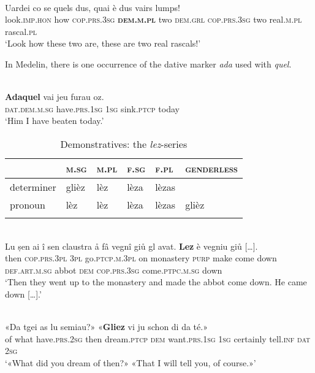 {\ea\label{ex:1:}
\\
\gll Uardei co se quels dus, quai è dus vairs lumps!\\
     look.\textsc{imp.hon} how \textsc{cop.prs.3sg} \textsc{\textbf{dem.m.pl}} two \textsc{dem.grl} \textsc{cop.prs.3sg} two real.\textsc{m.pl} rascal.\textsc{pl}  \\
\glt `Look how these two are, these are two real rascals!'
\z

In Medelin, there is one occurrence of the dative marker \textit{ada} used with \textit{quel}.

\ea\label{}
\\
\gll  \textbf{Adaquel} vai jeu furau oz. \\
    \textsc{dat.dem.m.sg} have.\textsc{prs.1sg} \textsc{1sg} sink.\textsc{ptcp} today \\
\glt `Him I have beaten today.'
\z


\begin{table}
\caption{Demonstratives: the \textit{lez}-series}
\label{demlez}
 \begin{tabular}{llllll}
  \lsptoprule
            & \textsc{m.sg} & \textsc{m.pl} & \textsc{f.sg} & \textsc{f.pl} & \textsc{genderless}\\
  \midrule
  determiner  & glièz &  lèz  & lèza  & lèzas\\
  pronoun  & lèz & lèz & lèza & lèzas & glièz \\
  \lspbottomrule
 \end{tabular}
\end{table}

\ea\label{}
\\
\gll Lu ṣen ai î sen claustra å fâ vegnî giů gl avat. \textbf{Lez} è vegniu giů […].\\
     then \textsc{cop.prs.3pl} \textsc{3pl} go.\textsc{ptcp.m.3pl} on monastery \textsc{purp} make come down \textsc{def.art.m.sg} abbot \textsc{dem} \textsc{cop.prs.3sg} come.\textsc{ptpc.m.sg} down\\
\glt `Then they went up to the monastery and made the abbot come down. He came down […].'
\z

\ea\label{}
\\
\gll «Da tgei as lu semiau?» «\textbf{Gliez} vi ju schon di da té.»\\
     of what have.\textsc{prs.2sg} then dream.\textsc{ptcp} \textsc{dem} want.\textsc{prs.1sg} \textsc{1sg} 
 certainly tell.\textsc{inf} \textsc{dat} \textsc{2sg}\\
\glt `«What did you dream of then?» «That I will tell you, of course.»'
\z

}

